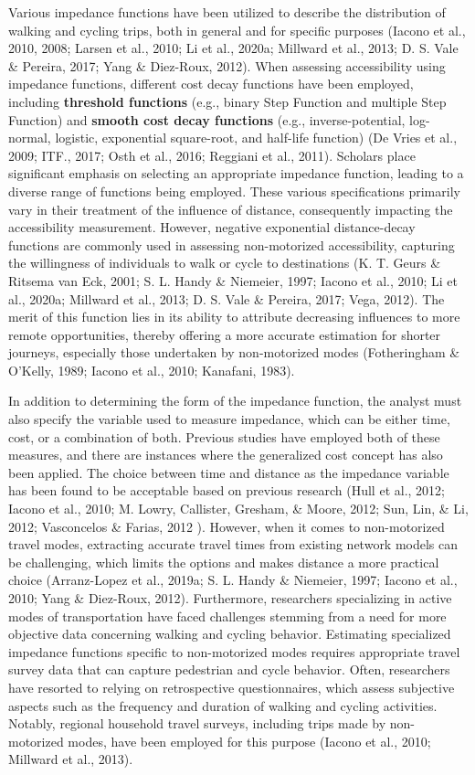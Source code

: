 \documentclass[
11pt, %
oneside, %
english, %
singlespacing, %
]{macthesis} %
\begin{document}
Various impedance functions have been utilized to describe the distribution of walking and cycling trips, both in general and for specific purposes (Iacono et al., 2010, 2008; Larsen et al., 2010; Li et al., 2020a; Millward et al., 2013; D. S. Vale \& Pereira, 2017; Yang \& Diez-Roux, 2012). When assessing accessibility using impedance functions, different cost decay functions have been employed, including \textbf{threshold functions} (e.g., binary Step Function and multiple Step Function) and \textbf{smooth cost decay functions} (e.g., inverse-potential, log-normal, logistic, exponential square-root, and half-life function) (De Vries et al., 2009; ITF., 2017; Osth et al., 2016; Reggiani et al., 2011). Scholars place significant emphasis on selecting an appropriate impedance function, leading to a diverse range of functions being employed. These various specifications primarily vary in their treatment of the influence of distance, consequently impacting the accessibility measurement. However, negative exponential distance-decay functions are commonly used in assessing non-motorized accessibility, capturing the willingness of individuals to walk or cycle to destinations (K. T. Geurs \& Ritsema van Eck, 2001; S. L. Handy \& Niemeier, 1997; Iacono et al., 2010; Li et al., 2020a; Millward et al., 2013; D. S. Vale \& Pereira, 2017; Vega, 2012). The merit of this function lies in its ability to attribute decreasing influences to more remote opportunities, thereby offering a more accurate estimation for shorter journeys, especially those undertaken by non-motorized modes (Fotheringham \& O'Kelly, 1989; Iacono et al., 2010; Kanafani, 1983).

In addition to determining the form of the impedance function, the analyst must also specify the variable used to measure impedance, which can be either time, cost, or a combination of both. Previous studies have employed both of these measures, and there are instances where the generalized cost concept has also been applied. The choice between time and distance as the impedance variable has been found to be acceptable based on previous research (Hull et al., 2012; Iacono et al., 2010; M. Lowry, Callister, Gresham, \& Moore, 2012; Sun, Lin, \& Li, 2012; Vasconcelos \& Farias, 2012 ). However, when it comes to non-motorized travel modes, extracting accurate travel times from existing network models can be challenging, which limits the options and makes distance a more practical choice (Arranz-Lopez et al., 2019a; S. L. Handy \& Niemeier, 1997; Iacono et al., 2010; Yang \& Diez-Roux, 2012). Furthermore, researchers specializing in active modes of transportation have faced challenges stemming from a need for more objective data concerning walking and cycling behavior. Estimating specialized impedance functions specific to non-motorized modes requires appropriate travel survey data that can capture pedestrian and cycle behavior. Often, researchers have resorted to relying on retrospective questionnaires, which assess subjective aspects such as the frequency and duration of walking and cycling activities. Notably, regional household travel surveys, including trips made by non-motorized modes, have been employed for this purpose (Iacono et al., 2010; Millward et al., 2013).
\end{document}
